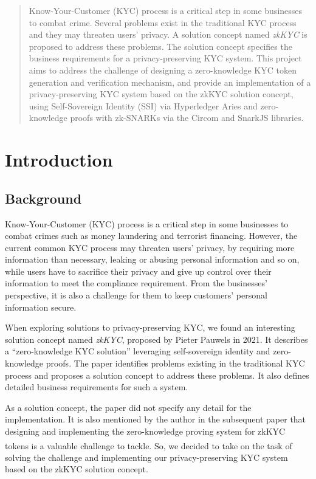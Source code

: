 \documentclass[
]{report}
\begin{document}
\tableofcontents

\renewcommand{\abstractname}{Abstract}
\begin{abstract}
Know-Your-Customer (KYC) process is a
critical step in some businesses to combat crime. Several problems exist
in the traditional KYC process and they may threaten users' privacy. A
solution concept named \emph{zkKYC} is proposed to address these
problems. The solution concept specifies the business requirements for a
privacy-preserving KYC system. This project aims to address the
challenge of designing a zero-knowledge KYC token generation and
verification mechanism, and provide an implementation of a
privacy-preserving KYC system based on the zkKYC solution concept, using
Self-Sovereign Identity (SSI) via Hyperledger Aries and zero-knowledge
proofs with zk-SNARKs via the Circom and SnarkJS libraries.
\end{abstract}

\chapter{Introduction}

\section{Background}

Know-Your-Customer (KYC) process is a critical step in some businesses
to combat crimes such as money laundering and terrorist financing.
However, the current common KYC process may threaten users' privacy, by
requiring more information than necessary, leaking or abusing personal
information and so on, while users have to sacrifice their privacy and
give up control over their information to meet the compliance
requirement. From the businesses' perspective, it is also a challenge
for them to keep customers' personal information secure.

When exploring solutions to privacy-preserving KYC, we found an
interesting solution concept named \emph{zkKYC}, proposed by Pieter
Pauwels in 2021. It describes a ``zero-knowledge KYC solution''
leveraging self-sovereign identity and zero-knowledge proofs. The paper
identifies problems existing in the traditional KYC process and proposes
a solution concept to address these problems. It also defines detailed
business requirements for such a system.

As a solution concept, the paper did not specify any detail for the
implementation. It is also mentioned by the author in the subsequent
paper that designing and implementing the zero-knowledge proving system
for zkKYC tokens is a valuable challenge to tackle\textsuperscript{\cite{cryptoeprint:2022/321}}. So, we decided to
take on the task of solving the challenge and implementing our
privacy-preserving KYC system based on the zkKYC solution concept.
\end{document}
